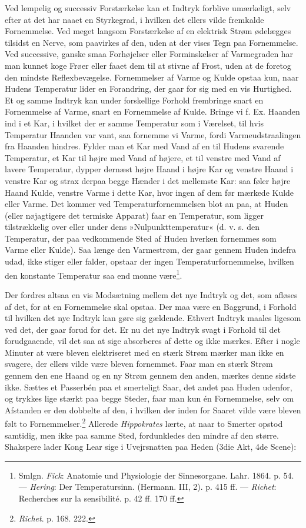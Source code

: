 \documentclass[12pt,a4paper,openany]{book}
\newcommand{\opage}[1]{\marginnote{\footnotesize\textit{[#1]}}}
\begin{document}
Ved lempelig og successiv Forstærkelse kan et Indtryk forblive
umærkeligt, selv efter at det har naaet en Styrkegrad, i hvilken det
ellers vilde fremkalde Fornemmelse. Ved meget langsom Forstærkelse af en
elektrisk Strøm ødelægges tilsidst en Nerve, som paavirkes af den, uden
at der vises Tegn paa
\opage{131}Fornemmelse. Ved successive, ganske smaa Forhøjelser eller
Forminskelser af Varmegraden har man kunnet koge Frøer eller faaet dem
til at stivne af Frost, uden at de foretog den mindste Reflexbevægelse.
Fornemmelser af Varme og Kulde opstaa kun, naar Hudens Temperatur lider
en Forandring, der gaar for sig med en vis Hurtighed. Et og samme
Indtryk kan under forskellige Forhold frembringe snart en Fornemmelse af
Varme, snart en Fornemmelse af Kulde. Bringe vi f. Ex. Haanden ind i et
Kar, i hvilket der er samme Temperatur som i Værelset, til hvis
Temperatur Haanden var vant, saa fornemme vi Varme, fordi
Varmeudstraalingen fra Haanden hindres. Fylder man et Kar med Vand af en
til Hudens svarende Temperatur, et Kar til højre med Vand af højere, et
til venstre med Vand af lavere Temperatur, dypper dernæst højre Haand i
højre Kar og venstre Haand i venstre Kar og strax derpaa begge Hænder i
det mellemste Kar: saa føler højre Haand Kulde, venstre Varme i dette
Kar, hvor ingen af dem før mærkede Kulde eller Varme. Det kommer ved
Temperaturfornemmelsen blot an paa, at Huden (eller nøjagtigere det
termiske Apparat) faar en Temperatur, som ligger tilstrækkelig over
eller under dens »Nulpunkttemperatur« (d. v. s. den Temperatur, der paa
vedkommende Sted af Huden hverken fornemmes som Varme eller Kulde). Saa
længe den Varmestrøm, der gaar gennem Huden indefra udad, ikke stiger
eller falder, opstaar der ingen Temperaturfornemmelse, hvilken den
konstante Temperatur saa end monne være\footnote[1]{Smlgn. \emph{Fick}:
Anatomie und Physiologie der Sinnesorgane. Lahr. 1864. p. 54. ---
\emph{Hering}: Der Temperatursinn. (Hermann. III, 2). p. 415 ff. ---
\emph{Richet}: Recherches sur la sensibilité. p. 42 ff. 170 ff.}.

Der fordres altsaa en vis Modsætning mellem det nye Indtryk og det, som
afløses af det, for at en Fornemmelse skal opstaa. Der maa være en
Baggrund, i Forhold til hvilken det nye Indtryk kan gøre sig gældende.
Ethvert Indtryk maales ligesom ved det, der gaar forud for det. Er nu
det nye Indtryk svagt i Forhold til det forudgaaende, vil det saa at
sige absorberes af dette og ikke mærkes. Efter i nogle Minuter at være
bleven elektriseret med en stærk Strøm mærker man ikke en svagere, der
ellers vilde være bleven fornemmet.
\opage{132}Faar man en stærk Strøm gennem den ene Haand og en ny Strøm
gennem den anden, mærkes denne sidste ikke. Sættes et Passerbén paa et
smerteligt Saar, det andet paa Huden udenfor, og trykkes lige stærkt paa
begge Steder, faar man kun én Fornemmelse, selv om Afstanden er den
dobbelte af den, i hvilken der inden for Saaret vilde være bleven følt
to Fornemmelser.\footnote[1]{\emph{Richet}. p. 168. 222.} Allerede
\emph{Hippokrates} lærte, at naar to Smerter opstod samtidig, men ikke
paa samme Sted, fordunkledes den mindre af den større. Shakspere lader
Kong Lear sige i Uvejrsnatten paa Heden (3die Akt, 4de Scene):
\end{document}
